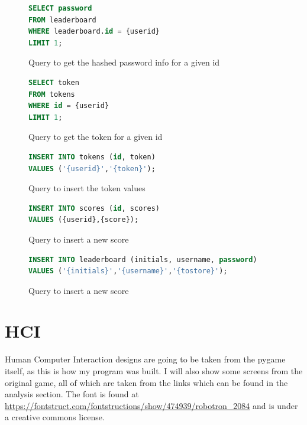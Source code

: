 \begin{figure}[H]
    \begin{lstlisting}[language=SQL, style=mystyle1]
SELECT password
FROM leaderboard
WHERE leaderboard.id = {userid}
LIMIT 1;
    \end{lstlisting}
      \centering
      \caption{Query to get the hashed password info for a given id}
      \label{fig:SQL4}
\end{figure}

\begin{figure}[H]
    \begin{lstlisting}[language=SQL, style=mystyle1]
SELECT token
FROM tokens
WHERE id = {userid}
LIMIT 1;
    \end{lstlisting}
      \centering
      \caption{Query to get the token for a given id}
      \label{fig:SQL5}
\end{figure}

\begin{figure}[H]
    \begin{lstlisting}[language=SQL, style=mystyle1]
INSERT INTO tokens (id, token)
VALUES ('{userid}','{token}');
    \end{lstlisting}
      \centering
      \caption{Query to insert the token values}
      \label{fig:SQL6}
\end{figure}

\begin{figure}[H]
    \begin{lstlisting}[language=SQL, style=mystyle1]
INSERT INTO scores (id, scores)
VALUES ({userid},{score});
    \end{lstlisting}
      \centering
      \caption{Query to insert a new score}
      \label{fig:SQL7}
\end{figure}

\begin{figure}[H]
    \begin{lstlisting}[language=SQL, style=mystyle1]
INSERT INTO leaderboard (initials, username, password)
VALUES ('{initials}','{username}','{tostore}');
    \end{lstlisting}
      \centering
      \caption{Query to insert a new score}
      \label{fig:SQL8}
\end{figure}



\section{HCI}
Human Computer Interaction designs are going to be taken from the pygame itself, as this is how my program was built. I will also show some screens from the original game, all of which are taken from the links which can be found in the analysis section. The font is found at \url{https://fontstruct.com/fontstructions/show/474939/robotron_2084} and is under a creative commons license.

